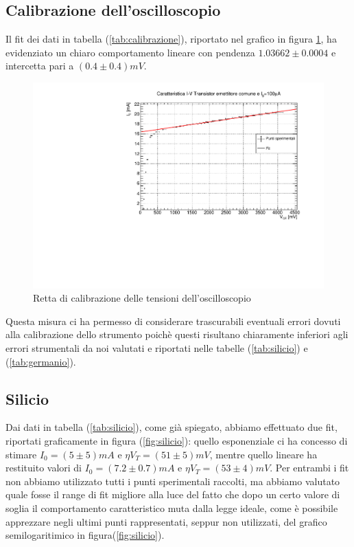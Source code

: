 \documentclass[]{article}
\begin{document}
  \subsection{Calibrazione dell'oscilloscopio}
Il fit dei dati in tabella (\ref{tab:calibrazione}), riportato nel grafico in figura \ref{fig:calibrazione}, ha evidenziato un chiaro comportamento lineare con pendenza $1.03662\pm0.0004$ e intercetta pari a $(0.4\pm0.4)mV$.

\begin{figure}[H]
	\centering
	\includegraphics[width=0.6\linewidth]{../100 muA/c1}
	\caption{Retta di calibrazione delle tensioni dell'oscilloscopio}
	\label{fig:calibrazione}
\end{figure}	

Questa misura ci ha permesso di considerare trascurabili eventuali errori dovuti alla calibrazione dello strumento poichè questi risultano chiaramente inferiori agli errori strumentali da noi valutati e riportati nelle tabelle (\ref{tab:silicio}) e (\ref{tab:germanio}).
\subsection{Silicio}
Dai dati in tabella (\ref{tab:silicio}), come già spiegato, abbiamo effettuato due fit, riportati graficamente in figura (\ref{fig:silicio}): quello esponenziale ci ha concesso di stimare $I_0=(5\pm5)mA$ e $\eta V_T=(51\pm5)mV$, mentre quello lineare ha restituito valori di $I_0=(7.2\pm0.7)mA$ e $\eta V_T=(53\pm4)mV$. Per entrambi i fit non abbiamo utilizzato tutti i punti sperimentali raccolti, ma abbiamo valutato quale fosse il range di fit migliore alla luce del fatto che dopo un certo valore di soglia il comportamento caratteristico muta dalla legge ideale, come è possibile apprezzare negli ultimi punti rappresentati, seppur non utilizzati, del grafico semilogaritimico in figura(\ref{fig:silicio}). 
\end{document}
